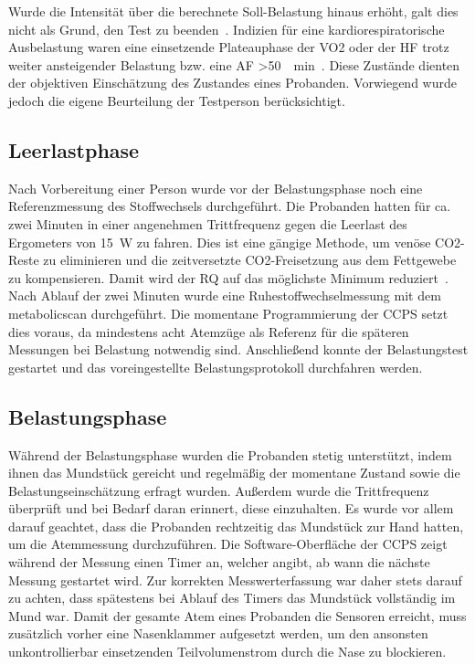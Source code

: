 Wurde die Intensität über die berechnete Soll-Belastung hinaus erhöht, galt dies nicht als Grund, den Test zu beenden~\cite{Wonisch.2008}. Indizien für eine kardiorespiratorische Ausbelastung waren eine einsetzende Plateauphase der \acs{VO2} oder der \acs{HF} trotz weiter ansteigender Belastung bzw. eine \acs{AF} >\SI{50}{\per\minute}~\cite{Kroidl.2015}. Diese Zustände dienten der objektiven Einschätzung des Zustandes eines Probanden. Vorwiegend wurde jedoch die eigene Beurteilung der Testperson berücksichtigt. 

\subsection{Leerlastphase}

Nach Vorbereitung einer Person wurde vor der Belastungsphase noch eine Referenzmessung des Stoffwechsels durchgeführt. Die Probanden hatten für ca. zwei Minuten in einer angenehmen Trittfrequenz gegen die Leerlast des Ergometers von \SI{15}{\watt} zu fahren. Dies ist eine gängige Methode, um venöse \acs{CO2}-Reste zu eliminieren und die zeitversetzte  \acs{CO2}-Freisetzung aus dem Fettgewebe zu kompensieren. Damit wird der \acs{RQ} auf das möglichste Minimum reduziert~\cite{Kroidl.2015}. Nach Ablauf der zwei Minuten wurde eine Ruhestoffwechselmessung mit dem metabolicscan durchgeführt. Die momentane Programmierung der \acs{CCPS} setzt dies voraus, da mindestens acht Atemzüge als Referenz für die späteren Messungen bei Belastung notwendig sind. Anschließend konnte der Belastungstest gestartet und das voreingestellte Belastungsprotokoll durchfahren werden.

\subsection{Belastungsphase}

Während der Belastungsphase wurden die Probanden stetig unterstützt, indem ihnen das Mundstück gereicht und regelmäßig der momentane Zustand sowie die Belastungseinschätzung erfragt wurden. Außerdem wurde die Trittfrequenz überprüft und bei Bedarf daran erinnert, diese einzuhalten. Es wurde vor allem darauf geachtet, dass die Probanden rechtzeitig das Mundstück zur Hand hatten, um die Atemmessung durchzuführen. Die Software-Oberfläche der \acs{CCPS} zeigt während der Messung einen Timer an, welcher angibt, ab wann die nächste Messung gestartet wird. Zur korrekten Messwerterfassung war daher stets darauf zu achten, dass spätestens bei Ablauf des Timers das Mundstück vollständig im Mund war. Damit der gesamte Atem eines Probanden die Sensoren erreicht, muss zusätzlich vorher eine Nasenklammer aufgesetzt werden, um den ansonsten unkontrollierbar einsetzenden Teilvolumenstrom durch die Nase zu blockieren.

